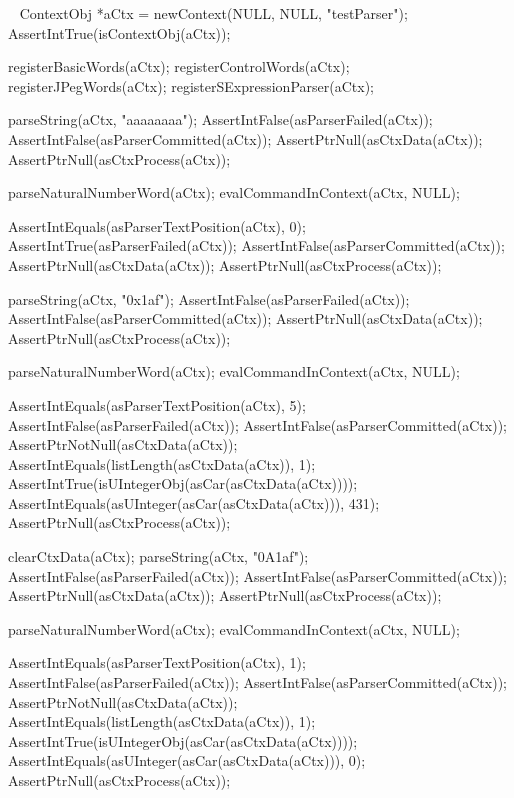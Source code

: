 \CTestsSuiteSetup\
\startCTest
  ContextObj *aCtx = newContext(NULL, NULL, "testParser");
  AssertIntTrue(isContextObj(aCtx));
  
  registerBasicWords(aCtx);
  registerControlWords(aCtx);
  registerJPegWords(aCtx);
  registerSExpressionParser(aCtx);
\stopCTest

\startCTest
  parseString(aCtx, "aaaaaaaa");
  AssertIntFalse(asParserFailed(aCtx));
  AssertIntFalse(asParserCommitted(aCtx));
  AssertPtrNull(asCtxData(aCtx));
  AssertPtrNull(asCtxProcess(aCtx));
  
  parseNaturalNumberWord(aCtx);
  evalCommandInContext(aCtx, NULL);
  
  AssertIntEquals(asParserTextPosition(aCtx), 0);
  AssertIntTrue(asParserFailed(aCtx));
  AssertIntFalse(asParserCommitted(aCtx));
  AssertPtrNull(asCtxData(aCtx));
  AssertPtrNull(asCtxProcess(aCtx));
\stopCTest
\stopTestCase

\startCTest
  parseString(aCtx, "0x1af");
  AssertIntFalse(asParserFailed(aCtx));
  AssertIntFalse(asParserCommitted(aCtx));
  AssertPtrNull(asCtxData(aCtx));
  AssertPtrNull(asCtxProcess(aCtx));
  
  parseNaturalNumberWord(aCtx);
  evalCommandInContext(aCtx, NULL);
  
  AssertIntEquals(asParserTextPosition(aCtx), 5);
  AssertIntFalse(asParserFailed(aCtx));
  AssertIntFalse(asParserCommitted(aCtx));
  AssertPtrNotNull(asCtxData(aCtx));
  AssertIntEquals(listLength(asCtxData(aCtx)), 1);
  AssertIntTrue(isUIntegerObj(asCar(asCtxData(aCtx))));
  AssertIntEquals(asUInteger(asCar(asCtxData(aCtx))), 431);  
  AssertPtrNull(asCtxProcess(aCtx));
  
  clearCtxData(aCtx);
  parseString(aCtx, "0A1af");
  AssertIntFalse(asParserFailed(aCtx));
  AssertIntFalse(asParserCommitted(aCtx));
  AssertPtrNull(asCtxData(aCtx));
  AssertPtrNull(asCtxProcess(aCtx));
  
  parseNaturalNumberWord(aCtx);
  evalCommandInContext(aCtx, NULL);
  
  AssertIntEquals(asParserTextPosition(aCtx), 1);
  AssertIntFalse(asParserFailed(aCtx));
  AssertIntFalse(asParserCommitted(aCtx));
  AssertPtrNotNull(asCtxData(aCtx));
  AssertIntEquals(listLength(asCtxData(aCtx)), 1);
  AssertIntTrue(isUIntegerObj(asCar(asCtxData(aCtx))));
  AssertIntEquals(asUInteger(asCar(asCtxData(aCtx))), 0);
  AssertPtrNull(asCtxProcess(aCtx));
  

